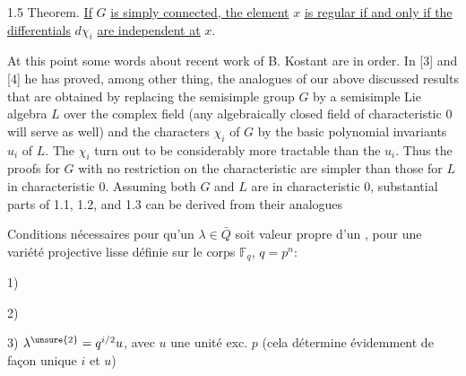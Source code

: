 1.5 Theorem. \uline{If} $G$ \uline{is simply connected, the element} $x$ \uline{is regular if and only if the differentials} $d\chi_i$ \uline{are independent at} $x$.

At this point some words about recent work of B. Kostant are in order. In [3] and [4] he has proved, among other thing, the analogues of our above discussed results that are obtained by replacing the semisimple group $G$ by a semisimple Lie algebra $L$ over the complex field (any algebraically closed field of characteristic $0$ will serve as well) and the characters $\chi_i$ of $G$ by the basic polynomial invariants $u_i$ of $L$. The $\chi_i$ turn out to be considerably more tractable than the $u_i$. Thus the proofs for $G$ with no restriction on the characteristic are simpler than those for $L$ in characteristic $0$. Assuming both $G$ and $L$ are in characteristic $0$, substantial parts of 1.1, 1.2, and 1.3 can be derived from their analogues



Conditions nécessaires pour qu'un $\lambda\in\bar Q$ soit valeur propre d'un , pour une variété projective lisse définie sur le corps $\mathbb F_q$, $q=p^n$:


1) 

2) 

3) $\lambda^{\unsure{2}}=q^{i/2}u$,  avec $u$ une unité  exc. $p$ (cela détermine évidemment de façon unique $i$ et $u$)





